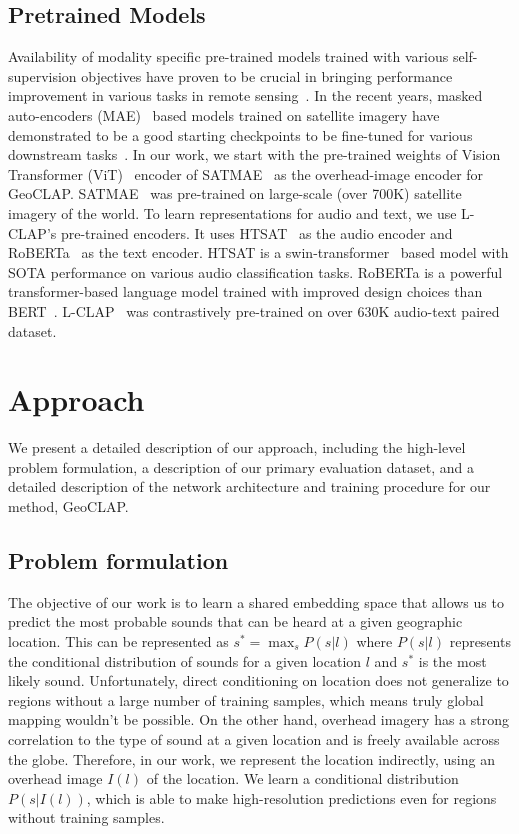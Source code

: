 \documentclass{bmvc2k}
\begin{document}
\subsection{Pretrained Models}
Availability of modality specific pre-trained models trained with various self-supervision objectives have proven to be crucial in bringing performance improvement in various tasks in remote sensing~\cite{wang2022self}. In the recent years, masked auto-encoders (MAE)~\cite{he2022masked} based models trained on satellite imagery have demonstrated to be a good starting checkpoints to be fine-tuned for various downstream tasks~\cite{cong2022satmae,reed2022scale}. In our work, we start with the pre-trained weights of Vision Transformer (ViT)~\cite{dosovitskiy2020vit} encoder of SATMAE~\cite{cong2022satmae} as the overhead-image encoder for GeoCLAP. SATMAE~\cite{cong2022satmae} was pre-trained on large-scale (over 700K) satellite imagery of the world.
To learn representations for audio and text, we use L-CLAP's pre-trained encoders. It uses HTSAT~\cite{chen2022hts} as the audio encoder and RoBERTa~\cite{liu2019roberta} as the text encoder. HTSAT is a swin-transformer~\cite{liu2021swin} based model with SOTA performance on various audio classification tasks. RoBERTa is a powerful transformer-based language model trained with improved design choices than BERT~\cite{devlin2018bert}. L-CLAP~\cite{laionclap2023} was contrastively pre-trained on over 630K audio-text paired dataset.

\section{Approach}
\label{sec:approach}

We present a detailed description of our approach, including the high-level problem formulation, a description of our primary evaluation dataset, and a detailed description of the network architecture and training procedure for our method, GeoCLAP.

\subsection{Problem formulation}

The objective of our work is to learn a shared embedding space that allows us to predict the most probable sounds that can be heard at a given geographic location. This can be represented as $s^* = \max_{s}P(s|l)$ where $P(s|l)$ represents the conditional distribution of sounds for a given location $l$ and $s^*$ is the most likely sound. Unfortunately, direct conditioning on location does not generalize to regions without a large number of training samples, which means truly global mapping wouldn't be possible. On the other hand, overhead imagery has a strong correlation to the type of sound at a given location and is freely available across the globe. Therefore, in our work, we represent the location indirectly, using an overhead image $I(l)$ of the location. We learn a conditional distribution $P(s|I(l))$, which is able to make high-resolution predictions even for regions without training samples.
\end{document}
